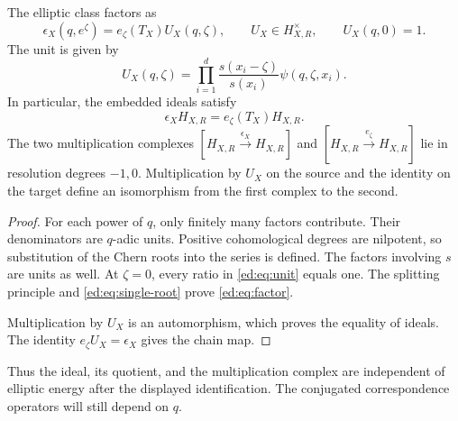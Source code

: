 \begin{theorem}\label{ed:thm:factor}
The elliptic class factors as
\begin{equation}\label{ed:eq:factor}
 \epsilon_X(q,e^\zeta)=e_\zeta(T_X)U_X(q,\zeta),
 \qquad U_X\in H_{X,R}^{\times},\qquad U_X(q,0)=1.
\end{equation}
The unit is given by
\begin{equation}\label{ed:eq:unit}
 U_X(q,\zeta)=\prod_{i=1}^d
       \frac{s(x_i-\zeta)}{s(x_i)}\psi(q,\zeta,x_i).
\end{equation}
In particular, the embedded ideals satisfy
\begin{equation}\label{ed:eq:ideal}
 \epsilon_XH_{X,R}=e_\zeta(T_X)H_{X,R}.
\end{equation}
The two multiplication complexes
$[H_{X,R}\xrightarrow{\epsilon_X}H_{X,R}]$ and
$[H_{X,R}\xrightarrow{e_\zeta}H_{X,R}]$ lie in resolution degrees
$-1,0$. Multiplication by $U_X$ on the source and the identity on the
target define an isomorphism from the first complex to the second.
\end{theorem}

\begin{proof}
For each power of $q$, only
finitely many factors contribute. Their denominators are $q$-adic units.
Positive cohomological degrees are nilpotent, so substitution of the
Chern roots into the series is defined. The factors involving $s$ are
units as well. At $\zeta=0$, every ratio in \eqref{ed:eq:unit} equals one.
The splitting principle and \eqref{ed:eq:single-root} prove
\eqref{ed:eq:factor}.

Multiplication by $U_X$ is an automorphism, which proves the equality of
ideals. The identity $e_\zeta U_X=\epsilon_X$ gives the chain map.
\end{proof}

Thus the ideal, its quotient, and the multiplication complex are
independent of elliptic energy after the displayed identification.
The conjugated correspondence operators will still depend on $q$.

